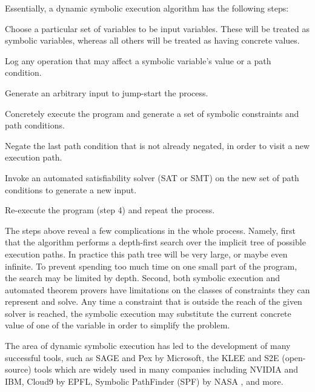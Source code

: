 Essentially, a dynamic symbolic execution algorithm has the following steps:
\begin{compactenum}
\item Choose a particular set of variables to be input variables. These will be treated as symbolic variables, whereas all others will be treated as having concrete values.
\item Log any operation that may affect a symbolic variable's value or a path condition.
\item Generate an arbitrary input to jump-start the process.
\item Concretely execute the program and generate a set of symbolic constraints and path conditions.
\item Negate the last path condition that is not already negated, in order to visit a new execution path.
\item Invoke an automated satisfiability solver (SAT or SMT) on the new set of path conditions to generate a new input.
\item Re-execute the program (step 4) and repeat the process.
\end{compactenum}


The steps above reveal a few complications in the whole process. Namely, first that the algorithm performs a depth-first search over the implicit tree of possible execution paths. In practice this path tree will be very large, or maybe even infinite. To prevent spending too much time on one small part of the program, the search may be limited by depth. Second, both symbolic execution and automated theorem provers have limitations on the classes of constraints they can represent and solve. Any time a constraint that is outside the reach of the given solver is reached, the symbolic execution may substitute the current concrete value of one of the variable in order to simplify the problem.

The area of dynamic symbolic execution has led to the development of many successful tools, such as SAGE and Pex by Microsoft, the KLEE \cite{esec:2005:Koushik,cav:2006:Koushik} and S2E (open-source) tools which are widely used in many companies including NVIDIA and IBM, Cloud9 by EPFL, Symbolic PathFinder (SPF) by NASA \cite{ase:2010:Pasareanu}, and more.